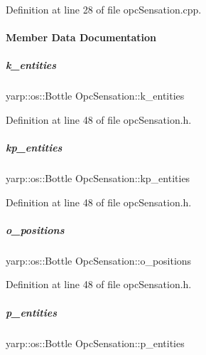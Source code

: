 Definition at line 28 of file opc\+Sensation.\+cpp.



\paragraph{Member Data Documentation}
\mbox{\label{group__sensationManager_ad235e03d016e8914a98df4da71538d1f}} 
\subparagraph{\texorpdfstring{k\+\_\+entities}{k\_entities}}
{\footnotesize\ttfamily yarp\+::os\+::\+Bottle Opc\+Sensation\+::k\+\_\+entities}



Definition at line 48 of file opc\+Sensation.\+h.

\mbox{\label{group__sensationManager_a195c83623e253d043f79d4818471190c}} 
\subparagraph{\texorpdfstring{kp\+\_\+entities}{kp\_entities}}
{\footnotesize\ttfamily yarp\+::os\+::\+Bottle Opc\+Sensation\+::kp\+\_\+entities}



Definition at line 48 of file opc\+Sensation.\+h.

\mbox{\label{group__sensationManager_a2b4d31782a277654808d319b177d516d}} 
\subparagraph{\texorpdfstring{o\+\_\+positions}{o\_positions}}
{\footnotesize\ttfamily yarp\+::os\+::\+Bottle Opc\+Sensation\+::o\+\_\+positions}



Definition at line 48 of file opc\+Sensation.\+h.

\mbox{\label{group__sensationManager_a876e783362e316f887cb602cbc34c87d}} 
\subparagraph{\texorpdfstring{p\+\_\+entities}{p\_entities}}
{\footnotesize\ttfamily yarp\+::os\+::\+Bottle Opc\+Sensation\+::p\+\_\+entities}



